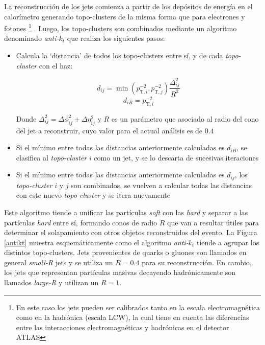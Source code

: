La reconstrucción de los jets comienza a partir de los depósitos de energía en el calorímetro generando topo-clusters de la misma forma que para electrones y fotones \footnote{En este caso los jets pueden ser calibrados tanto en la escala electromagnética como en la hadrónica (escala LCW), la cual tiene en cuenta las diferencias entre las interacciones electromagnéticas y hadrónicas en el detector ATLAS} \cite{Lampl:1099735}. Luego, los topo-clusters son combinados mediante un algoritmo denominado \textit{anti-$k_t$} \cite{Cacciari:2008gp} que realiza los siguientes pasos:

\begin{itemize}
	\item Calcula la `distancia' de todos los topo-clusters entre sí, y de cada \textit{topo-cluster} con el haz:

	\begin{equation}
		d_{ij} = \min(p_{\text{T},i}^{-2}, p_{\text{T},j}^{-2})\frac{\Delta_{ij}^{2}}{R^{2}}
	\end{equation}
	\begin{equation}
		d_{iB} = p_{\text{T},i}^{-2}
	\end{equation}

	Donde $\Delta_{ij}^{2} = \Delta\phi_{ij}^{2} + \Delta\eta_{ij}^{2}$ y $R$ es un parámetro que asociado al radio del cono del jet a reconstruir, cuyo valor para el actual análisis es de $0.4$

	\item Si el mínimo entre todas las distancias anteriormente calculadas es $d_{iB}$, se clasifica al \textit{topo-cluster} $i$ como un jet, y se lo descarta de sucesivas iteraciones

	\item Si el mínimo entre todas las distancias anteriormente calculadas es $d_{ij}$, los \textit{topo-cluster} $i$ y $j$ son combinados, se vuelven a calcular todas las distancias con este nuevo \textit{topo-cluster} y se itera nuevamente 

\end{itemize}

Este algoritmo tiende a unificar las partículas \textit{soft} con las \textit{hard} y separar a las partículas \textit{hard} entre sí, formando conos de radio $R$ que van a resultar útiles para determinar el solapamiento con otros objetos reconstruidos del evento. La Figura \ref{antikt} muestra esquemáticamente como el algoritmo \textit{anti-$k_t$} tiende a agrupar los distintos topo-clusters. Jets provenientes de quarks o gluones son llamados en general \textit{small-R} jets y se utiliza un $R=0.4$ para su reconstrucción. En cambio, los jets que representan partículas masivas decayendo hadrónicamente son llamados \textit{large-R} y utilizan un $R=1$.

